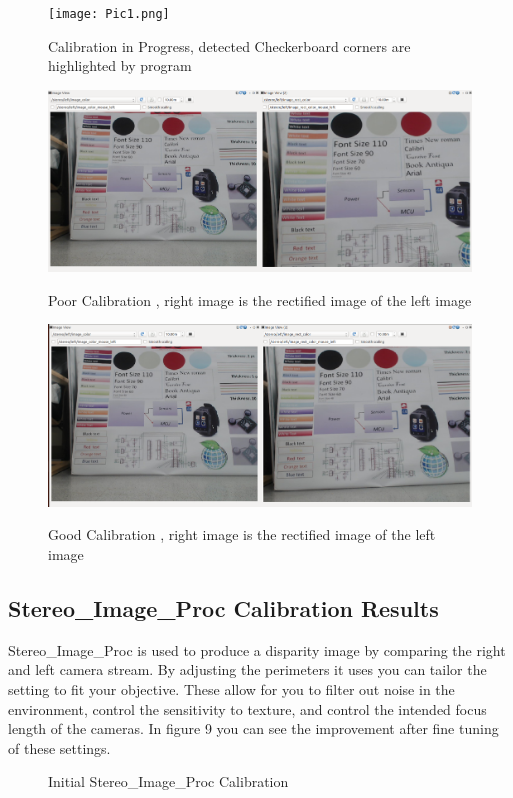 \documentclass[10pt]{article}
\begin{document}
\begin{figure}[H]
\centering \texttt{[image: Pic1.png]}\label{Chekerboard}
\caption{Calibration in Progress, detected Checkerboard corners are highlighted by program}
\end{figure}

\begin{figure}[H]
\centering \includegraphics[width=1\textwidth]{BadCalibration.png}\label{Result Bad Calibration}
\caption{Poor Calibration , right image is the rectified image of the left image}
\end{figure}

\begin{figure}[H]
\centering \includegraphics[width=1\textwidth]{GoodCalibration.png}\label{Result Good Calibration}
\caption{Good Calibration , right image is the rectified image of the left image}
\end{figure}

\subsection{Stereo\_Image\_Proc Calibration Results}
Stereo\_Image\_Proc is used to produce a disparity image by comparing the right and left camera stream. By adjusting the perimeters it uses you can tailor the setting to fit your objective. These allow for you to filter out noise in the environment, control the sensitivity to texture, and control the intended focus length of the cameras. In figure 9 you can see the improvement after fine tuning of these settings.    
\begin{figure}[H]
\hfill
{}
\hfill
{}
\hfill
\caption{Initial Stereo\_Image\_Proc Calibration}
\end{figure}
\end{document}
